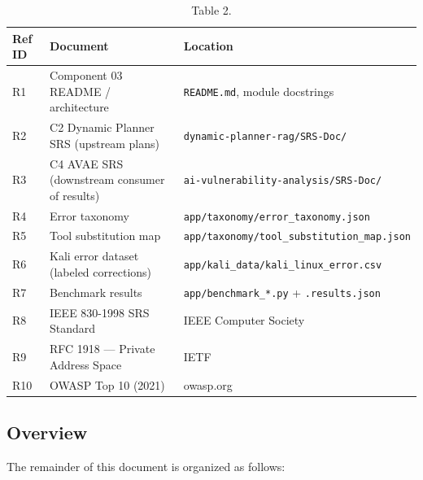 \documentclass[10pt,journal,onecolumn]{IEEEtran}
\begin{document}
\begin{table}[h]
\caption{Table 2.}
\label{tab:t2}
\begin{tabularx}{\columnwidth}{l >{\raggedright\arraybackslash}X >{\raggedright\arraybackslash}X}
\toprule
\textbf{Ref ID} & \textbf{Document} & \textbf{Location}\\
\midrule
R1 & Component 03 README / architecture & \texttt{README.md}, module docstrings\\
R2 & C2 Dynamic Planner SRS (upstream plans) & \texttt{dynamic-\allowbreak planner-\allowbreak rag/\allowbreak SRS-\allowbreak Doc/\allowbreak }\\
R3 & C4 AVAE SRS (downstream consumer of results) & \texttt{ai-\allowbreak vulnerability-\allowbreak analysis/\allowbreak SRS-\allowbreak Doc/\allowbreak }\\
R4 & Error taxonomy & \texttt{app/\allowbreak taxonomy/\allowbreak error\_\allowbreak taxonomy.\allowbreak json}\\
R5 & Tool substitution map & \texttt{app/\allowbreak taxonomy/\allowbreak tool\_\allowbreak substitution\_\allowbreak map.\allowbreak json}\\
R6 & Kali error dataset (labeled corrections) & \texttt{app/\allowbreak kali\_\allowbreak data/\allowbreak kali\_\allowbreak linux\_\allowbreak error.\allowbreak csv}\\
R7 & Benchmark results & \texttt{app/benchmark\_*.py} + \texttt{.results.json}\\
R8 & IEEE 830-1998 SRS Standard & IEEE Computer Society\\
R9 & RFC 1918 --- Private Address Space & IETF\\
R10 & OWASP Top 10 (2021) & owasp.org\\
\bottomrule
\end{tabularx}
\end{table}

\subsection{Overview}

The remainder of this document is organized as follows:
\end{document}
